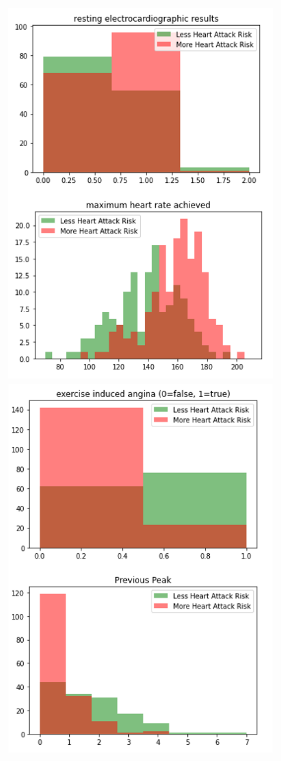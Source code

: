 \documentclass[11pt, oneside]{article}
\begin{document}
\begin{figure}[H]
    \centering
    \includegraphics[width=7cm]{Corr3.png}
    \includegraphics[width=7cm]{Corr4.png}

\end{figure}
\end{document}
